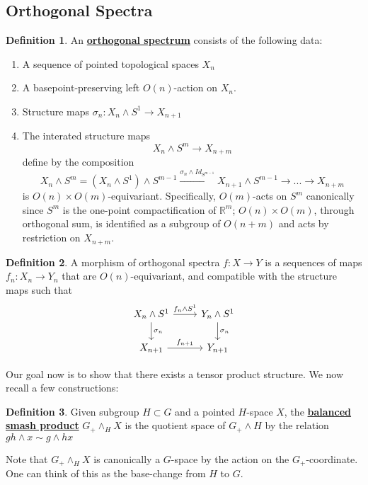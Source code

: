 \documentclass{article}
\theoremstyle{definition}
\theoremstyle{definition}
\newtheorem{definition}{Definition}[theorem]
\theoremstyle{definition}
\theoremstyle{definition}
\theoremstyle{definition}
\theoremstyle{definition}
\theoremstyle{definition}
\begin{document}
\subsection{Orthogonal Spectra}

\begin{tcolorbox}[colback=purple!5!white,colframe=purple!75!black]
\begin{definition}
An \underline{\textbf{orthogonal spectrum}} consists of the following data:
\begin{enumerate}
    \item A sequence of pointed topological spaces $X_n$
    \item A basepoint-preserving left $O(n)$-action on $X_n$.
    \item Structure maps $\sigma_n:X_n\wedge S^1\to X_{n+1}$
    \item The interated structure maps
    \[X_n\wedge S^m\to X_{n+m}\]
    define by the composition 
    \[X_{n}\wedge S^m=(X_n\wedge S^1)\wedge S^{m-1}\xrightarrow{\sigma_n\wedge Id_{S^{m-1}}}X_{n+1}\wedge S^{m-1}\to...\to X_{n+m}\]
    is $O(n)\times O(m)$-equivariant. Specifically, $O(m)$-acts on $S^m$ canonically since $S^m$ is the one-point compactification of $\mathbb{R}^m$; $O(n)\times O(m)$, through orthogonal sum, is identified as a subgroup of $O(n+m)$ and acts by restriction on $X_{n+m}$.
\end{enumerate}
\end{definition}
\end{tcolorbox}


\begin{tcolorbox}[colback=purple!5!white,colframe=purple!75!black]
\begin{definition}
A morphism of orthogonal spectra $f: X\to Y$ is a sequences of maps $f_n: X_n\to Y_n$ that are $O(n)$-equivariant, and compatible with the structure maps such that 
\[\begin{tikzcd}
X_n \wedge S^1 \arrow[r,"f_n\wedge S^1"]\arrow[d,"\sigma_n"]& Y_n\wedge S^1\arrow[d,"\sigma_n"]\\
X_{n+1}\arrow[r,"f_{n+1}"]& Y_{n+1}
\end{tikzcd}\]
\end{definition}
\end{tcolorbox}
Our goal now is to show that there exists a tensor product structure. We now recall a few constructions: 

\begin{tcolorbox}[colback=purple!5!white,colframe=purple!75!black]
\begin{definition}
Given subgroup $H\subset G$ and a pointed $H$-space $X$, the \underline{\textbf{balanced smash product}} $G_+\wedge_{H} X$ is the quotient space of $G_+\wedge H$ by the relation $gh\wedge x\sim g\wedge hx$
\end{definition}
\end{tcolorbox}
Note that $G_+\wedge_{H} X$ is canonically a $G$-space by the action on the $G_+$-coordinate. One can think of this as the base-change from $H$ to $G$. 
\end{document}
